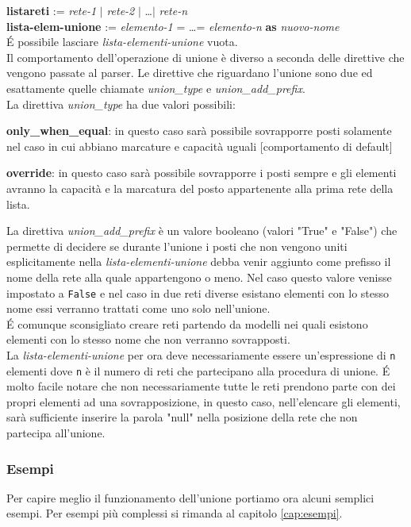 \documentclass[italian,12pt]{book}
\begin{document}
{\small
{\bf lista\-reti} := \emph{rete-1} $|$ \emph{rete-2} $|$ \dots $|$
\emph{rete-n} \\

{\bf lista-elem-unione} := \emph{elemento-1} = \dots = \emph{elemento-n} {\bf as}
\emph{nuovo-nome} \\

}
\'E  possibile lasciare \emph{lista-elementi-unione} vuota. \\
Il comportamento dell'operazione di unione è diverso a seconda delle
direttive che vengono passate al parser. Le direttive che riguardano
l'unione sono due ed esattamente quelle chiamate \emph{union\_type} e
\emph{union\_add\_prefix}.\\
La direttiva \emph{union\_type} ha due valori possibili:
\begin{description}
\item{{\bf only\_when\_equal}}: in questo caso sarà possibile
  sovrapporre posti solamente nel caso in cui abbiano marcature e
  capacità uguali [comportamento di default]
\item{{\bf override}}: in questo caso sarà possibile sovrapporre i
  posti sempre e gli elementi avranno la capacità e la marcatura del
  posto appartenente alla prima rete della lista.
\end{description}
La direttiva \emph{union\_add\_prefix} è un valore booleano (valori
"True" e "False") che permette di decidere se durante l'unione i posti
che non vengono uniti esplicitamente nella
\emph{lista-elementi-unione} debba venir aggiunto come prefisso il
nome della rete alla quale appartengono o meno. Nel caso questo valore
venisse impostato a {\tt False} e nel caso in due reti diverse esistano
elementi con lo stesso nome essi verranno trattati come uno solo
nell'unione.\\
\'E comunque sconsigliato creare reti partendo da modelli nei quali
esistono elementi con lo stesso nome che non verranno sovrapposti.\\
La \emph{lista-elementi-unione} per ora deve necessariamente essere
un'espressione di {\tt n} elementi dove {\tt n} è il numero di reti
che partecipano alla procedura di unione. \'E molto facile notare che
non necessariamente tutte le reti prendono parte con dei propri
elementi ad una sovrapposizione, in questo caso, nell'elencare gli
elementi, sarà sufficiente inserire la parola "null" nella posizione
della rete che non partecipa all'unione.

\subsubsection{Esempi}
Per capire meglio il funzionamento dell'unione portiamo ora alcuni semplici
esempi. Per esempi più complessi si rimanda al capitolo
\ref{cap:esempi}.
\end{document}
